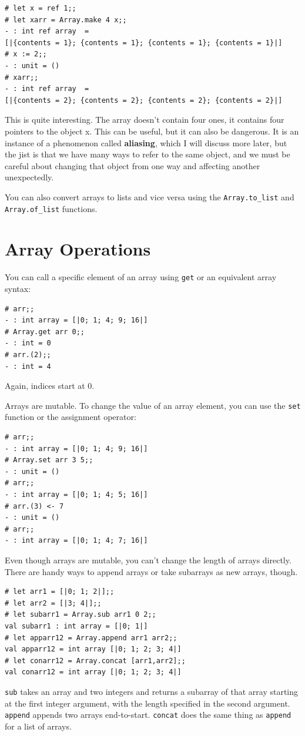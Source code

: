 \documentclass[10pt]{book}
\begin{document}
{\beforeverb
\begin{verbatim}
# let x = ref 1;;
# let xarr = Array.make 4 x;;
- : int ref array  = 
[|{contents = 1}; {contents = 1}; {contents = 1}; {contents = 1}|]
# x := 2;;
- : unit = ()
# xarr;;
- : int ref array  = 
[|{contents = 2}; {contents = 2}; {contents = 2}; {contents = 2}|]
\end{verbatim}
\afterverb

This is quite interesting. The array doesn't contain four ones, it contains
four pointers to the object x. This can be useful, but it can also be dangerous.
It is an instance of a phenomenon called {\bf aliasing}, which I will discuss more
later, but the jist is that we have many ways to refer to the same object, and we 
must be careful about changing that object from one way and affecting another unexpectedly.

You can also convert arrays to lists and vice versa using 
the \verb"Array.to_list" and
\verb"Array.of_list" functions.

\section{Array Operations}

You can call a specific element of an array using {\tt get} 
or an equivalent array syntax:

\beforeverb
\begin{verbatim}
# arr;;
- : int array = [|0; 1; 4; 9; 16|]
# Array.get arr 0;;
- : int = 0
# arr.(2);;
- : int = 4
\end{verbatim}
\afterverb
Again, indices start at 0.

Arrays are mutable. To change the value of an array 
element, you can use the {\tt set} function or the 
assignment operator:

\beforeverb
\begin{verbatim}
# arr;;
- : int array = [|0; 1; 4; 9; 16|]
# Array.set arr 3 5;;
- : unit = ()
# arr;;
- : int array = [|0; 1; 4; 5; 16|]
# arr.(3) <- 7
- : unit = ()
# arr;;
- : int array = [|0; 1; 4; 7; 16|]
\end{verbatim}
\afterverb

Even though arrays are mutable, you can't change the length 
of arrays directly. There are handy ways to append arrays 
or take subarrays as new arrays, though.

\beforeverb
\begin{verbatim}
# let arr1 = [|0; 1; 2|];;
# let arr2 = [|3; 4|];;
# let subarr1 = Array.sub arr1 0 2;;
val subarr1 : int array = [|0; 1|]
# let apparr12 = Array.append arr1 arr2;;
val apparr12 = int array [|0; 1; 2; 3; 4|]
# let conarr12 = Array.concat [arr1,arr2];;
val conarr12 = int array [|0; 1; 2; 3; 4|]
\end{verbatim}
\afterverb
{\tt sub} takes an array and two integers and returns a 
subarray of that array starting at the first integer 
argument, with the length specified in the second argument. 
{\tt append} appends two arrays end-to-start. {\tt concat} 
does the same thing as {\tt append} for a list of arrays.

}
\end{document}
